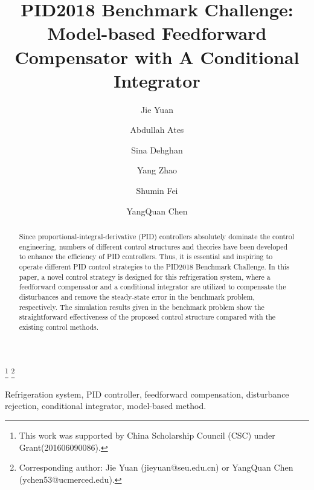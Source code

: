 \documentclass{ifacconf}
\begin{document}
\begin{frontmatter}

\title{PID2018 Benchmark Challenge: Model-based Feedforward Compensator with A Conditional Integrator }

\thanks[footnoteinfo]{This work was supported by China Scholarship Council (CSC) under Grant(201606090086).}
\thanks[footnoteinfo]{Corresponding author: Jie Yuan (jieyuan@seu.edu.cn) or YangQuan Chen (ychen53@ucmerced.edu).}

\author[First,Fifth]{Jie Yuan}
\author[Second]{Abdullah Ates}
\author[Third]{Sina Dehghan}
\author[Fourth]{Yang Zhao}
\author[Fifth]{Shumin Fei}
\author[Third]{YangQuan Chen}

\address[First]{School of Automation, Southeast University, Nanjing
210096, China (e-mail: {\tt{jieyuan@seu.edu.cn}}).}
\address[Second]{Engineering Faculty, Computer Engineering Department,Inonu University, Malatya, 44280, Turkey (e-mail:{\tt{ abdullah.ates@inonu.edu.tr}}).}
\address[Third]{Mechatronics, Embedded Systems and Automation
Lab, University of California, Merced, CA 95340, USA (e-mail: {\tt{sdehghan@ucmerced.edu}}; {\tt{ychen53@ucmerced.edu}})}
\address[Fourth]{School of Science and Engineering, Shandong
University, Jinan 250061, China, (e-mail: {\tt{zdh1136@gmail.com}})}
\address[Fifth]{Key Laboratory of Measurement and
Control of CSE, Ministry of Education, School of Automation, Southeast
University, Nanjing 210096, China, (e-mail: {\tt{smfei@seu.edu.cn}})}

\begin{abstract}                %
Since proportional-integral-derivative (PID) controllers absolutely dominate the control engineering, numbers of different control structures and theories have been developed to enhance the efficiency of PID controllers. Thus, it is essential and inspiring to operate different PID control strategies to the PID2018 Benchmark Challenge. In this paper, a novel control strategy is designed for this refrigeration system, where a feedforward compensator and a conditional integrator are utilized to compensate the disturbances and remove the steady-state error in the benchmark problem, respectively. The simulation results given in the benchmark problem show the straightforward effectiveness of the proposed control structure compared with the existing control methods.
\end{abstract}

\begin{keyword}
Refrigeration system, PID controller, feedforward compensation, disturbance rejection, conditional integrator, model-based method.
\end{keyword}

\end{frontmatter}
\end{document}
